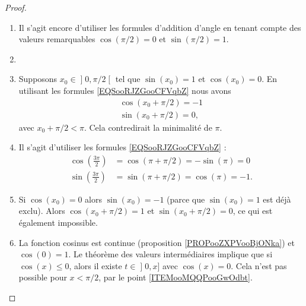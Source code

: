 \begin{proof}
\begin{enumerate}
			      Supposons que \( \sin(\pi/2)=-1\). Le théorème des valeurs intermédiaires~\ref{ThoValInter} dit qu'il existe \( x_0\in\mathopen] \epsilon , \pi/2 \mathclose[\) tel que \( \sin(x_0)=0\). Pour cette valeur de \( x_0\) nous devons aussi avoir \( \cos(x_0)=\pm 1\). Mais puisque \( 2\pi\) est minimum pour avoir \( \cos=1\) et \( \sin=0\), nous devons avoir \( \cos(x_0)=-1\). Alors nous avons aussi
		      \begin{subequations}
			      \begin{align}
				      \cos(x_0+\pi) & =\cos(x_0)\cos(\pi)-\sin(x_0)\sin(\pi)  =-\cos(x_0)   =1  \\
				      \sin(x_0+\pi) & =\cos(x_0)\sin(\pi)+\sin(x_0)\cos(\pi)  = \sin(x_0)   =0.
			      \end{align}
		      \end{subequations}
		      Encore une fois par minimalité de \( 2\pi\), cela ne va pas. Conclusion : \( \sin(\pi/2)=1\).
		\item
		      Il s'agit encore d'utiliser les formules d'addition d'angle en tenant compte des valeurs remarquables \( \cos(\pi/2)=0\) et \( \sin(\pi/2)=1\).
		\item
		\item
		      Supposons \( x_0\in\mathopen] 0 , \pi/2 \mathclose[\) tel que \( \sin(x_0)=1\) et \( \cos(x_0)=0\). En utilisant les formules \eqref{EQSooRJZGooCFVqbZ} nous avons
		      \begin{subequations}
			      \begin{align}
				      \cos(x_0+\pi/2)=-1 \\
				      \sin(x_0+\pi/2)=0,
			      \end{align}
		      \end{subequations}
		      avec \( x_0+\pi/2<\pi\). Cela contredirait la minimalité de \( \pi\).
		\item
		      Il s'agit d'utiliser les formules \eqref{EQSooRJZGooCFVqbZ} :
		      \begin{subequations}
			      \begin{align}
				      \cos(\frac{ 3\pi }{ 2 }) & =\cos(\pi+\pi/2)   =-\sin(\pi) =0   \\
				      \sin(\frac{ 3\pi }{ 2 }) & =\sin(\pi+\pi/2)   = \cos(\pi) =-1.
			      \end{align}
		      \end{subequations}
		\item
		      Si \( \cos(x_0)=0\) alors \( \sin(x_0)=-1\) (parce que \( \sin(x_0)=1\) est déjà exclu). Alors \( \cos(x_0+\pi/2)=1\) et \( \sin(x_0+\pi/2)=0\), ce qui est également impossible.
		\item
		      La fonction cosinus est continue (proposition \ref{PROPooZXPVooBjONka}) et \( \cos(0)=1\). Le théorème des valeurs intermédiaires implique que si \( \cos(x)\leq 0\), alors il existe \( t\in \mathopen] 0 , x \mathclose]\) avec \( \cos(x)=0\). Cela n'est pas possible pour \( x<\pi/2\), par le point \ref{ITEMooMQQPooGwOdbt}.


\end{enumerate}
\end{proof}
